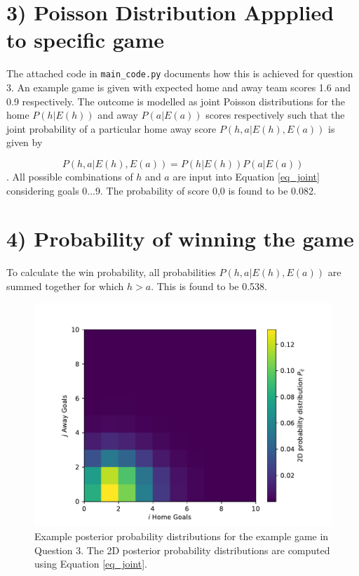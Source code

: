 \documentclass[10pt]{article}
\begin{document}
\section{3) Poisson Distribution Appplied to specific game}

The attached code in \verb|main_code.py| documents how this is achieved for question 3. An example game is given with expected home and away team scores 1.6 and 0.9 respectively. The outcome is modelled as joint Poisson distributions for the home $P(h|E(h))$ and away $P(a|E(a))$ scores respectively such that the joint probability of a particular home away score $P(h,a|E(h),E(a))$ is given by

\begin{equation}
\label{eq_joint}
P(h,a|E(h),E(a)) = P(h|E(h)) P(a|E(a))
\end{equation} 
\noindent. All possible combinations of $h$ and $a$ are input into Equation \ref{eq_joint} considering goals 0...9. The probability of score 0,0 is found to be 0.082.


\section{4) Probability of winning the game}
\label{sec_win}
To calculate the win probability, all probabilities $P(h,a|E(h),E(a))$ are summed together for which $h>a$. This is found to be 0.538.





\begin{figure}
\begin{center}
\includegraphics[scale=1.0,angle=0,trim=0cm 0cm 0cm 0cm]{fig_eg_posterior.pdf}
\caption{Example posterior probability distributions for the example game in Question 3. The 2D posterior probability distributions are computed using Equation \ref{eq_joint}. }
\label{fig_posterior_eg}
\end{center}
\end{figure} 
\end{document}
